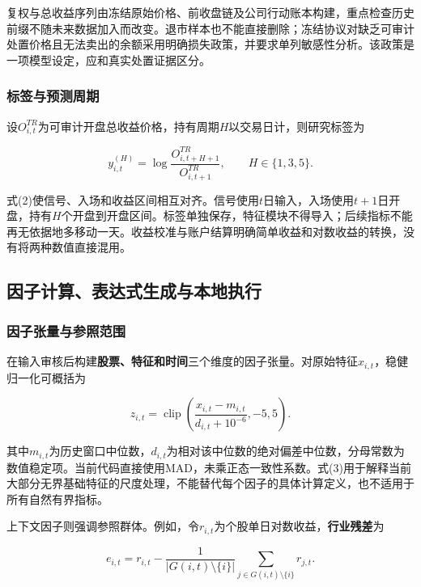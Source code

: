 \documentclass[UTF8,12pt,a4paper,fontset=none]{ctexart}
\begin{document}
复权与总收益序列由冻结原始价格、前收盘链及公司行动账本构建，重点检查历史前缀不随未来数据加入而改变。退市样本也不能直接删除；冻结协议对缺乏可审计处置价格且无法卖出的余额采用明确损失政策，并要求单列敏感性分析。该政策是一项模型设定，应和真实处置证据区分。


\subsubsection{标签与预测周期}

设$O^{TR}_{i,t}$为可审计开盘总收益价格，持有周期$H$以交易日计，则研究标签为


\begin{equation}
 y^{(H)}_{i,t}=\log\frac{O^{TR}_{i,t+H+1}}{O^{TR}_{i,t+1}},\qquad H\in\{1,3,5\}. \tag{2}
\end{equation}

式(2)使信号、入场和收益区间相互对齐。信号使用$t$日输入，入场使用$t+1$日开盘，持有$H$个开盘到开盘区间。标签单独保存，特征模块不得导入；后续指标不能再无依据地多移动一天。收益校准与账户结算明确简单收益和对数收益的转换，没有将两种数值直接混用。


\subsection{因子计算、表达式生成与本地执行}

\subsubsection{因子张量与参照范围}

在输入审核后构建\textbf{股票、特征和时间}三个维度的因子张量。对原始特征$x_{i,t}$，稳健归一化可概括为


\begin{equation}
 z_{i,t}=\operatorname{clip}\!\left(\frac{x_{i,t}-m_{i,t}}{d_{i,t}+10^{-6}},-5,5\right). \tag{3}
\end{equation}

其中$m_{i,t}$为历史窗口中位数，$d_{i,t}$为相对该中位数的绝对偏差中位数，分母常数为数值稳定项。当前代码直接使用MAD，未乘正态一致性系数。式(3)用于解释当前大部分无界基础特征的尺度处理，不能替代每个因子的具体计算定义，也不适用于所有自然有界指标。


上下文因子则强调参照群体。例如，令$r_{i,t}$为个股单日对数收益，\textbf{行业残差}为


\begin{equation}
 e_{i,t}=r_{i,t}-\frac{1}{|G(i,t)\setminus\{i\}|}\sum_{j\in G(i,t)\setminus\{i\}}r_{j,t}. \tag{4}
\end{equation}
\end{document}
